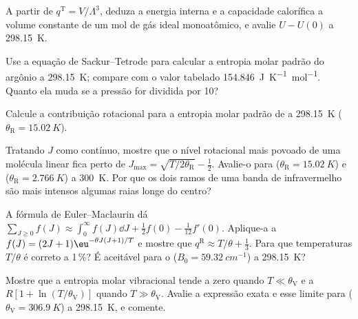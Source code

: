 \begin{exercise}[$\star\star$]\label{exo:b3:partition-functions:7}
A partir de $q^{\mathrm T} = V/\Lambda^3$, deduza a energia interna e a capacidade calorífica a
volume constante de um mol de gás ideal monoatômico, e avalie $U - U(0)$ a
\qty{298.15}{K}.
\end{exercise}

\begin{exercise}[$\star\star$]\label{exo:b3:partition-functions:8}
Use a equação de Sackur--Tetrode para calcular a entropia molar padrão do
argônio a \qty{298.15}{K}; compare com o valor tabelado
\qty{154.846}{J.K^{-1}.mol^{-1}}. Quanto ela muda se a pressão for dividida por 10?
\end{exercise}

\begin{exercise}[$\star\star$]\label{exo:b3:partition-functions:9}
Calcule a contribuição rotacional para a entropia molar padrão de
 a \qty{298.15}{K} ($\theta_{\mathrm R} = \qty{15.02}{K}$).
\end{exercise}

\begin{exercise}[$\star\star\star$]\label{exo:b3:partition-functions:10}
Tratando $J$ como contínuo, mostre que o nível rotacional mais povoado de uma
molécula linear fica perto de $J_{\max} = \sqrt{T/2\theta_{\mathrm R}} - \frac12$. Avalie-o para 
($\theta_{\mathrm R} = \qty{15.02}{K}$) e  ($\theta_{\mathrm R} = \qty{2.766}{K}$) a \qty{300}{K}. Por que os dois
ramos de uma banda de infravermelho são mais intensos algumas raias longe do centro?
\end{exercise}

\begin{exercise}[$\star\star\star$]\label{exo:b3:partition-functions:11}
A fórmula de Euler--Maclaurin dá $\sum_{J\ge0}f(J) \approx \int_0^\infty f(J)\dd J + \frac12f(0) -
\frac1{12}f'(0)$. Aplique-a a $f(J) = (2J+1)\eu^{-\theta J(J+1)/T}$ e mostre que $q^{\mathrm R} \approx T/\theta +
\frac13$. Para que temperaturas $T/\theta$ é correto a 1\,\%? É aceitável para o 
($B_0 = \qty{59.32}{cm^{-1}}$) a \qty{298.15}{K}?
\end{exercise}

\begin{exercise}[$\star\star\star$]\label{exo:b3:partition-functions:12}
Mostre que a entropia molar vibracional tende a zero quando $T \ll \theta_{\mathrm V}$ e a
$R[1 + \ln(T/\theta_{\mathrm V})]$ quando $T \gg \theta_{\mathrm V}$. Avalie a expressão exata e esse limite
para  ($\theta_{\mathrm V} = \qty{306.9}{K}$) a \qty{298.15}{K}, e comente.
\end{exercise}

